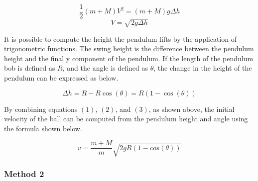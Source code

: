 \documentclass[11pt]{article}
\begin{document}
\[
\frac{1}{2}(m + M)V^2 = (m + M)g\Delta h
\]
\begin{equation}
V = \sqrt{2g \Delta h}
\end{equation}

It is possible to compute the height the pendulum lifts by the
application of trigonometric functions. The swing height is the difference
between the pendulum height and the final y component of the pendulum.
If the length of the pendulum bob is defined as \(R\), and the angle is
defined as \(\theta\), the change in the height of the pendulum can be
expressed as below.

\begin{equation}
\Delta h = R - R \cos(\theta) = R(1 - \cos(\theta))
\end{equation}

By combining equations \((1)\), \((2)\), and \((3)\), as shown above,
the initial velocity of the ball can be computed from the pendulum
height and angle using the formula shown below.

\begin{equation}
v = \frac {m + M}{m} \sqrt {2gR(1 - cos(\theta))}
\end{equation}

\hypertarget{method-2}{%
\subsubsection*{\centering Method 2}\label{method-2}}
\end{document}
